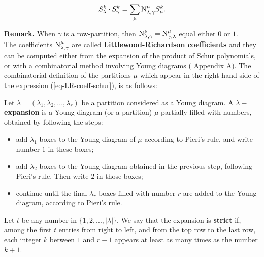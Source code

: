 \documentclass[main.tex]{subfiles}
\begin{document}
\begin{equation}
    \label{eq-LR-coeff-schur}
    S_\lambda^k \cdot S_\gamma^k = \sum_{\mu} \text{N}^{\mu}_{\lambda, \gamma}S_\mu^k.
\end{equation}

\textbf{Remark.} When $\gamma$ is a row-partition, then $\text{N}^{\mu}_{\lambda, \gamma} = \text{N}^{\mu}_{\gamma, \lambda}$ equal either $0$ or $1$.\\

The coefficients $\text{N}^{\mu}_{\lambda, \gamma}$ are called \textbf{Littlewood-Richardson coefficients} and they can be computed either from the expansion of the product of Schur polynomials, or with a combinatorial method involving Young diagrams (\cite{fulton1991representation} Appendix A). The combinatorial definition of the partitions $\mu$ which appear in the right-hand-side of the expression (\ref{eq-LR-coeff-schur}), is as follows:

\bigskip

\begin{defn}
    \label{def-partition-expansion}
    Let $\lambda = (\lambda_1, \lambda_2, ..., \lambda_r)$ be a partition considered as a Young diagram. A \textbf{$\lambda-$expansion} is a Young diagram (or a partition) $\mu$ partially filled with numbers, obtained by following the steps:
        \begin{itemize}
            \item add $\lambda_1$ boxes to the Young diagram of $\mu$ according to Pieri's rule, and write number $1$ in these boxes;
            \item add $\lambda_2$ boxes to the Young diagram obtained in the previous step, following Pieri's rule. Then write $2$ in those boxes;
            \item continue until the final $\lambda_r$ boxes filled with number $r$ are added to the Young diagram, according to Pieri's rule.
        \end{itemize}
    Let $t$ be any number in $\{1,2,...,|\lambda|\}$. We say that the expansion is \textbf{strict} if, among the first $t$ entries from right to left, and from the top row to the last row, each integer $k$ between $1$ and $r-1$ appears at least as many times as the number $k+1$.
\end{defn}

\bigskip
\end{document}
